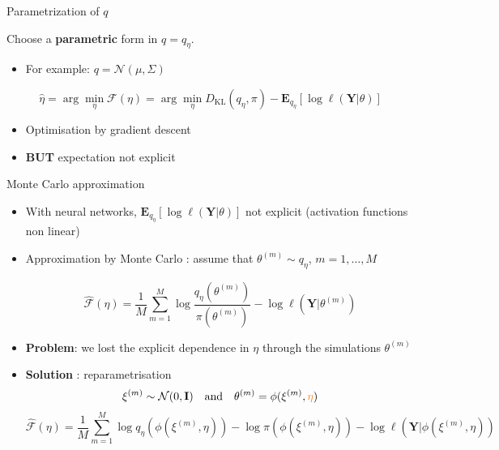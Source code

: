 \documentclass[compress,10pt]{beamer}
\begin{document}
\begin{frame}{Parametrization of $q$}



Choose a \textbf{parametric} form in $q = q_{\eta}$. 
  
  \begin{itemize}
 \item For example: $q = \mathcal{N}(\mu,\Sigma)$ 
\end{itemize}

$$\hat{\eta} = \arg\min_{\eta} \mathcal{F}(\eta) = \arg\min_{\eta} D_{\text{KL}}(q_{\eta},\pi) - \mathbf{E}_{q_{\eta}}[\log \ell(\mathbf{Y}|\theta)]$$

\begin{itemize}
 \item Optimisation by gradient descent
  \item   \textbf{BUT} expectation not explicit
  \end{itemize}
\end{frame}

\begin{frame}{Monte Carlo approximation}
 

\begin{itemize}
 \item With neural networks, $\mathbf{E}_{q_{\eta}}[\log \ell(\mathbf{Y}|\theta)]$  not explicit (activation functions non linear)
  
 \item Approximation by Monte Carlo :  assume that $\theta^{(m)} \sim q_{\eta}$, $m = 1,\dots, M$
  
$$\widehat{\mathcal{F}}(\eta) = \frac{1}{M}\sum_{m=1}^M  \log \frac{q_{\eta}(\theta ^{(m)})}{\pi(\theta^{(m)})} -  \log \ell(\mathbf{Y}|\theta^{(m)})$$
  
  \item \textbf{Problem}:  we lost the explicit dependence in $\eta$ through the simulations  $\theta^{(m)}$ 
  
  \item \textbf{Solution} : reparametrisation $$\xi^{(m)}\sim \mathcal{N}(0,\mathbf{I})  \quad \mbox{and} \quad \theta^{(m)} = \phi(\xi^{(m)},{\color{orange}\eta} )$$
$$\widehat{\mathcal{F}}(\eta) = \frac{1}{M}\sum_{m=1}^M   \log q_{\eta}(\phi(\xi^{(m)},\eta)) - \log \pi(\phi(\xi^{(m)},\eta)) - \log \ell(\mathbf{Y}| \phi(\xi^{(m)},\eta))$$
\end{itemize}
\end{frame}
\end{document}
